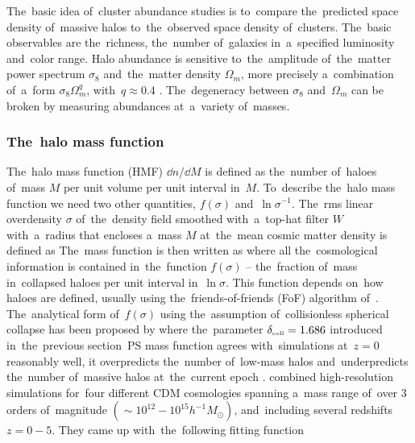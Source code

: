 The~basic idea of~cluster abundance studies is to~compare the~predicted space density of~massive halos to~the~observed space density of~clusters. The~basic observables are the~richness, the~number of~galaxies in~a~specified luminosity and~color range. Halo abundance is sensitive to~the~amplitude of~the~matter power spectrum $\sigma_8$ and~the~matter density $\Omega_m$, more precisely a~combination of~a~form $\sigma_8\Omega_m^q$, with~$q\approx0.4$ \textcite{white}. The~degeneracy between $\sigma_8$ and~$\Omega_m$ can be broken by measuring abundances at~a~variety of~masses.
\subsubsection{The~halo mass function}
The~halo mass function (HMF) $\dd n/\dd M$ is defined as the~number of~haloes of~mass $M$ per unit volume per unit interval in~$M$. To~describe the~halo mass function we need two other quantities, $f(\sigma)$ and~$\ln\sigma^{-1}$. The~rms linear overdensity $\sigma$ of~the~density field smoothed with~a~top-hat filter $W$ with~a~radius that encloses a~mass $M$ at~the~mean cosmic matter density is defined as \DIFaddbegin \parencite{2015IJMPD..2430004B}
\DIFaddend {}
The~mass function is then written as
where all the~cosmological information is contained in~the~function \(f(\sigma)\) --  the~fraction of~mass in~collapsed haloes per unit interval in~$\ln\sigma$. This function depends on~how haloes are defined, usually using the~friends-of-friends (FoF) algorithm of~\textcite{1985ApJ...292..371D}. The~analytical form of~$f(\sigma)$ using the~assumption of~collisionless spherical collapse has been proposed by \textcite{1974ApJ...187..425P}
where the~parameter \(\delta_\text{\tiny coll}=1.686\) \DIFaddbegin {}\DIFaddend introduced in~the~previous section\DIFdelbegin {}\DIFdelend \DIFaddbegin {}\DIFaddend ~PS mass function agrees with~simulations at~$z=0$ reasonably well, \DIFaddbegin {}\DIFaddend it overpredicts the~number of~low-mass halos and~underpredicts the~number of~massive halos at~the~current epoch \DIFaddbegin \parencite{2007ApJ...671.1160L}\DIFaddend . \textcite{2001MNRAS.321..372J} combined high-resolution simulations for~four different CDM cosmologies spanning a~mass range of~over 3 orders of~magnitude $(\sim10^{12}-10^{15}h^{-1}M_\odot)$, and~including several redshifts $z=0-5$. They came up with~the~following fitting function
